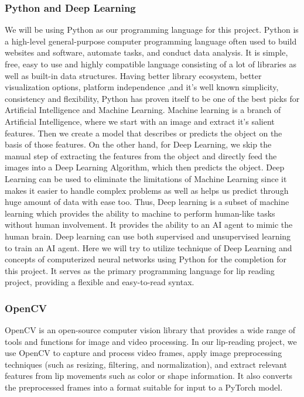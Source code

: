  	\subsubsection{Python and Deep Learning}
We will be using Python as our programming language for this project. Python is a high-level general-purpose computer programming language often used to build websites and software, automate tasks, and conduct data analysis. It is simple, free, easy to use and highly compatible language consisting of a lot of libraries as well as built-in data structures. Having better library ecosystem, better visualization options, platform independence ,and it’s well known simplicity, consistency and flexibility, Python has proven itself to be one of the best picks for Artificial Intelligence and Machine Learning. Machine learning is a branch of Artificial Intelligence, where we start with an image and extract it’s salient features. Then we create a model that describes or predicts the object on the basis of those features. On the other hand, for Deep Learning, we skip the manual step of extracting the features from the object and directly feed the images into a Deep Learning Algorithm, which then predicts the object. Deep Learning can be used to eliminate the limitations of Machine Learning since it makes it easier to handle complex problems as well as helps us predict through huge amount of data with ease too. Thus, Deep learning is a subset of machine learning which provides the ability to machine to perform human-like tasks without human involvement. It provides the ability to an AI agent to mimic the human brain. Deep learning can use both supervised and unsupervised learning to train an AI agent. Here we will try to utilize technique of Deep Learning and concepts of computerized neural networks using Python for the completion for this project. It serves as the primary programming language for  lip reading project, providing a flexible and easy-to-read syntax.
\break
\subsubsection{OpenCV}
OpenCV is an open-source computer vision library that provides a wide range of tools and functions for image and video processing. In our lip-reading project, we use OpenCV to capture and process video frames, apply image preprocessing techniques (such as resizing, filtering, and normalization), and extract relevant features from lip movements such as color or shape information. It also converts the preprocessed frames into a format suitable for input to a PyTorch model.
\break
\pagebreak
